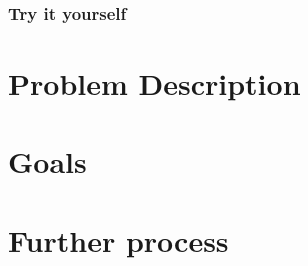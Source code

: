 \documentclass{scrartcl}
\begin{document}
    \subsubsection{Try it yourself}

\section{Problem Description}
\label{sec:problem}

\section{Goals}
\label{sec:goal}

\section{Further process}
\label{sec:process}
\end{document}
